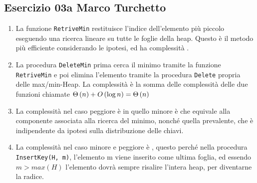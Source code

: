 
\subsection[03a MT]{Esercizio 03a Marco Turchetto}

\begin{enumerate}[label=\alph*)]
%	
	
\item
	La funzione \texttt{RetriveMin} restituisce l'indice dell'elemento più piccolo eseguendo una ricerca lineare su tutte le foglie della heap.
	Questo è il metodo più efficiente considerando le ipotesi, ed ha complessità .
	
	
	
\item
	La procedura \texttt{DeleteMin} prima cerca il minimo tramite la funzione \texttt{RetriveMin} e poi elimina l'elemento tramite la procedura \texttt{Delete} propria delle max/min-Heap.
	La complessità è la somma delle complessità delle due funzioni chiamate \( \Theta\left(n\right) + O\left( \log n\right) = \Theta\left(n\right)\)
	
	
	
\item
	La complessità nel caso peggiore è in quello minore è  che equivale alla componente associata alla ricerca del minimo, nonché quella prevalente, che è indipendente da ipotesi sulla distribuzione delle chiavi.
	
\item
	La complessità nel caso minore e peggiore è , questo perché nella procedura \texttt{InsertKey(H, m)}, l'elemento m viene inserito come ultima foglia, ed essendo \( m > max(H) \) l'elemento dovrà sempre risalire l'intera heap, per diventarne la radice.
	
	
		
\end{enumerate}






